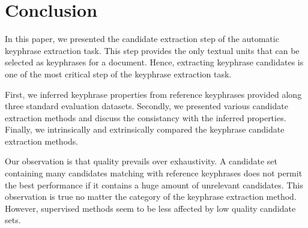
\section{Conclusion}
\label{sec:conclusion}
  In this paper, we presented the candidate extraction step of the automatic
  keyphrase extraction task. This step provides the only textual units that can
  be selected as keyphrases for a document. Hence, extracting keyphrase
  candidates is one of the most critical step of the keyphrase extraction task.
  
  First, we inferred keyphrase properties from reference keyphrases provided
  along three standard evaluation datasets. Secondly, we presented various
  candidate extraction methods and discuss the consistancy with the inferred
  properties. Finally, we intrinsically and extrinsically compared the keyphrase
  candidate extraction methods.

  Our observation is that quality prevails over exhaustivity. A candidate set
  containing many candidates matching with reference keyphrases does not permit
  the best performance if it contains a huge amount of unrelevant candidates.
  This observation is true no matter the category of the keyphrase extraction
  method. However, supervised methods seem to be less affected by low quality
  candidate sets.
